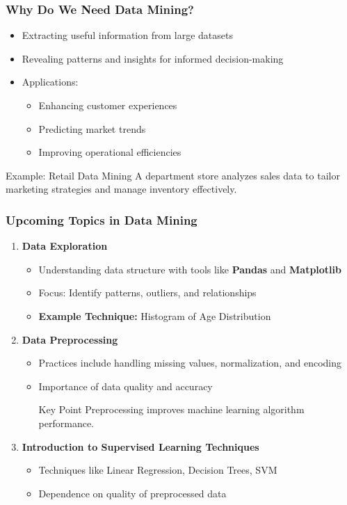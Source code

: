 \documentclass[aspectratio=169]{beamer}
\begin{document}
\begin{frame}[fragile]
    \frametitle{Why Do We Need Data Mining?}
    \begin{itemize}
        \item Extracting useful information from large datasets
        \item Revealing patterns and insights for informed decision-making
        \item Applications:
        \begin{itemize}
            \item Enhancing customer experiences
            \item Predicting market trends
            \item Improving operational efficiencies
        \end{itemize}
    \end{itemize}
    \begin{block}{Example: Retail Data Mining}
        A department store analyzes sales data to tailor marketing strategies and manage inventory effectively.
    \end{block}
\end{frame}

\begin{frame}[fragile]
    \frametitle{Upcoming Topics in Data Mining}
    \begin{enumerate}
        \item \textbf{Data Exploration}
        \begin{itemize}
            \item Understanding data structure with tools like \textbf{Pandas} and \textbf{Matplotlib}
            \item Focus: Identify patterns, outliers, and relationships
            \item \textbf{Example Technique:} Histogram of Age Distribution
        \end{itemize}
        
        \item \textbf{Data Preprocessing}
        \begin{itemize}
            \item Practices include handling missing values, normalization, and encoding
            \item Importance of data quality and accuracy
            \begin{block}{Key Point}
                Preprocessing improves machine learning algorithm performance.
            \end{block}
        \end{itemize}
        
        \item \textbf{Introduction to Supervised Learning Techniques}
        \begin{itemize}
            \item Techniques like Linear Regression, Decision Trees, SVM
            \item Dependence on quality of preprocessed data
        \end{itemize}
    \end{enumerate}
\end{frame}
\end{document}

